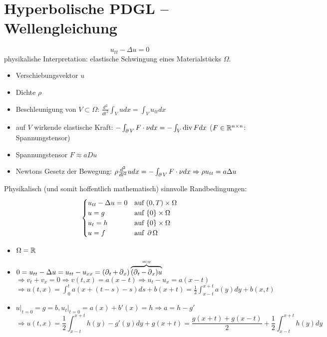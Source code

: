 \section{Hyperbolische PDGL -- Wellengleichung}
\label{sec:para13}
	\[ u_{tt} - \Delta u = 0 \]
	physikalishe Interpretation: elastische Schwingung eines Materialstücks $\Omega$.
	\begin{itemize}
		\item Verschiebungsvektor $u$
		\item Dichte $\rho$
		\item Beschleunigung von $V \subset \Omega$: $\frac{d^2}{dt^2} \int_V udx = \int_V u_{tt} dx$
		\item auf $V$ wirkende elastische Kraft: $-\int_{\operatorname{\partial} V} F \cdot \nu dx = - \int_V \operatorname{div} F dx$ ($F \in \mathbb{R}^{n \times n}$: Spannungstensor)
		\item Spannungstensor $F \approx a Du$
		\item Newtons Gesetz der Bewegung: $\rho \frac{d^2}{dt^2} u dx = - \int_{\operatorname{\partial} V} F \cdot \nu dx \Rightarrow \rho u_{tt} = a \Delta u$
	\end{itemize}
	Physikalisch (und somit hoffentlich mathematisch) sinnvolle Randbedingungen:
	\[ \begin{cases}
	u_{tt} - \Delta u = 0	&	\text{auf } (0,T) \times \Omega	\\
	u = g	&	\text{auf } \{0\} \times \Omega	\\
	u_t = h	&	\text{auf } \{0\} \times \Omega \\
	u = f & \text{auf } \operatorname{\partial} \Omega
	\end{cases} \]
	
\begin{thm}
	\begin{itemize}
		\item $\Omega = \mathbb{R}$
		\item $0 = u_{tt} - \Delta u = u_{tt} - u_{xx} = (\operatorname{\partial}_t + \operatorname{\partial}_x)\overbrace{(\operatorname{\partial}_t - \operatorname{\partial}_x)u}^{=: v}$ \\
		$\Rightarrow v_t + v_x = 0 \Rightarrow v(t,x) = a(x-t) \Rightarrow u_t - u_x = a(x-t)$\\
		$\Rightarrow u(t,x) = \int_{0}^{t} a(x+(t-s)-s)ds + b(x+t) = \frac{1}{2} \int_{x-t}^{x+t} a(y) dy + b(x,t)$
		\item $u \big|_{t=0} = g = b, u_t \big|_{t=0} = a(x) + b'(x) = h \Rightarrow a = h-g'$ \\
		\[\Rightarrow u(t,x) = \frac{1}{2} \int_{x-t}^{x+t} h(y) - g'(y) dy + g(x+t) = \frac{g(x+t)+g(x-t)}{2} + \frac{1}{2} \int_{x-t}^{x+t} h(y) dy\]
	\end{itemize}
\end{thm}
	
